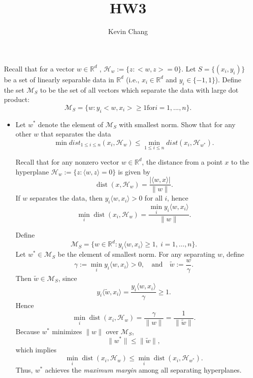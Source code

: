 \documentclass[a4paper]{article}
\title{HW3}
\author{Kevin Chang}
\begin{document}
\maketitle

\section{}
Recall that for a vector $w \in \mathbb{R}^d$ , $\mathcal{H}_w := \{z : <w, z> = 0\}$.
Let $S = \{(x_i , y_i )\}$ be a set of linearly separable data in $\mathbb{R}^d$ (i.e., $x_i \in \mathbb{R}^d$ and $y_i \in \{-1, 1\}$).
Define the set $\mathcal{M}_S$ to be the set of all vectors which separate the data with large dot product:
$$\mathcal{M}_S = \{w : y_i <w, x_i > \geq 1 \text{for} i = 1, . . . , n\}.$$
\begin{itemize}
    \item Let $w^*$ denote the element of $\mathcal{M}_S$ with smallest norm.
Show that for any other $w$ that separates the data $$\min \mathit{dist}_{1\leq i\leq n}(x_i , \mathcal{H}_w ) \leq \min_{1\leq i\leq n} \mathit{dist}(x_i , \mathcal{H}_{w^*}) .$$

Recall that for any nonzero vector \( w \in \mathbb{R}^d \), the distance from a point \( x \) to the hyperplane 
\(\mathcal{H}_w := \{z : \langle w, z \rangle = 0\}\) is given by
\[
\operatorname{dist}(x, \mathcal{H}_w) = \frac{|\langle w, x \rangle|}{\|w\|}.
\]
If \( w \) separates the data, then \( y_i \langle w, x_i \rangle > 0 \) for all \( i \), hence
\[
\min_i \operatorname{dist}(x_i, \mathcal{H}_w)
= \frac{\min_i y_i \langle w, x_i \rangle}{\|w\|}.
\]

Define
\[
\mathcal{M}_S = \{ w \in \mathbb{R}^d : y_i \langle w, x_i \rangle \ge 1, \; i = 1, \ldots, n \}.
\]
Let \( w^* \in \mathcal{M}_S \) be the element of smallest norm.  
For any separating \( w \), define
\[
\gamma := \min_i y_i \langle w, x_i \rangle > 0, 
\quad \text{and} \quad 
\tilde{w} := \frac{w}{\gamma}.
\]
Then \( \tilde{w} \in \mathcal{M}_S \), since
\[
y_i \langle \tilde{w}, x_i \rangle = \frac{y_i \langle w, x_i \rangle}{\gamma} \ge 1.
\]
Hence
\[
\min_i \operatorname{dist}(x_i, \mathcal{H}_w)
= \frac{\gamma}{\|w\|}
= \frac{1}{\|\tilde{w}\|}.
\]
Because \( w^* \) minimizes \( \|w\| \) over \( \mathcal{M}_S \),
\[
\|w^*\| \le \|\tilde{w}\|,
\]
which implies
\[
\min_i \operatorname{dist}(x_i, \mathcal{H}_w)
\le
\min_i \operatorname{dist}(x_i, \mathcal{H}_{w^*}).
\]
Thus, \( w^* \) achieves the \emph{maximum margin} among all separating hyperplanes.


\end{itemize}
\end{document}
